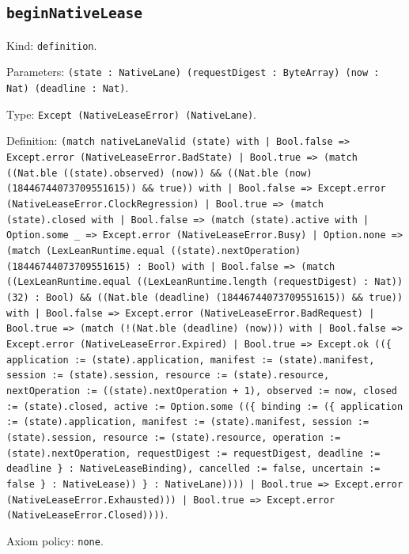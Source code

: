 \documentclass[11pt]{article}
\begin{document}
\subsection*{\texttt{beginNativeLease}}
\noindent Kind: \texttt{definition}.\par
\noindent Parameters: \texttt{(state : NativeLane) (requestDigest : ByteArray) (now : Nat) (deadline : Nat)}.\par
\noindent Type: \texttt{Except (NativeLeaseError) (NativeLane)}.\par
\noindent Definition: \texttt{(match nativeLaneValid (state) with | Bool.false => Except.error (NativeLeaseError.BadState) | Bool.true => (match ((Nat.ble ((state).observed) (now)) \&\& ((Nat.ble (now) (18446744073709551615)) \&\& true)) with | Bool.false => Except.error (NativeLeaseError.ClockRegression) | Bool.true => (match (state).closed with | Bool.false => (match (state).active with | Option.some \_ => Except.error (NativeLeaseError.Busy) | Option.none => (match (LexLeanRuntime.equal ((state).nextOperation) (18446744073709551615) : Bool) with | Bool.false => (match ((LexLeanRuntime.equal ((LexLeanRuntime.length (requestDigest) : Nat)) (32) : Bool) \&\& ((Nat.ble (deadline) (18446744073709551615)) \&\& true)) with | Bool.false => Except.error (NativeLeaseError.BadRequest) | Bool.true => (match (!(Nat.ble (deadline) (now))) with | Bool.false => Except.error (NativeLeaseError.Expired) | Bool.true => Except.ok ((\{ application := (state).application, manifest := (state).manifest, session := (state).session, resource := (state).resource, nextOperation := ((state).nextOperation + 1), observed := now, closed := (state).closed, active := Option.some ((\{ binding := (\{ application := (state).application, manifest := (state).manifest, session := (state).session, resource := (state).resource, operation := (state).nextOperation, requestDigest := requestDigest, deadline := deadline \} : NativeLeaseBinding), cancelled := false, uncertain := false \} : NativeLease)) \} : NativeLane)))) | Bool.true => Except.error (NativeLeaseError.Exhausted))) | Bool.true => Except.error (NativeLeaseError.Closed))))}.\par
\noindent Axiom policy: \texttt{none}.\par
\end{document}
